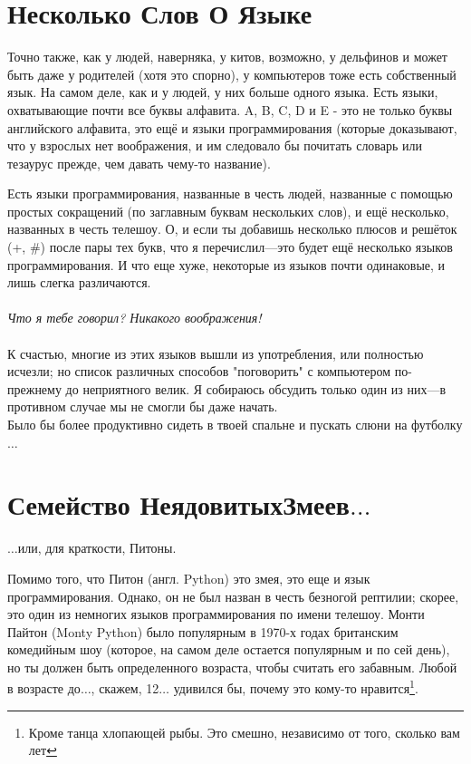 \section{Несколько Слов О Языке}

Точно также, как у людей, наверняка, у китов, возможно, у дельфинов и может быть даже у родителей (хотя это спорно), у компьютеров тоже есть собственный язык. На самом деле, как и у людей, у них больше одного языка. Есть языки, охватывающие почти все буквы алфавита. A, B, C, D и E - это не только буквы английского алфавита, это ещё и языки программирования (которые доказывают, что у взрослых нет воображения, и им следовало бы почитать словарь или тезаурус прежде, чем давать чему-то название).

Есть языки программирования, названные в честь людей, названные с помощью простых сокращений (по заглавным буквам нескольких слов), и ещё несколько, названных в честь телешоу. О, и если ты добавишь несколько плюсов и решёток (+, \#) после пары тех букв, что я перечислил---это будет ещё несколько языков программирования. И что еще хуже, некоторые из языков почти одинаковые, и лишь слегка различаются.
\\
\\
\emph{Что я тебе говорил? Никакого воображения! }
\\
\\
К счастью, многие из этих языков вышли из употребления, или полностью исчезли; но список различных способов "поговорить" с компьютером по-прежнему до неприятного велик. Я собираюсь обсудить только один из них---в противном случае мы не смогли бы даже начать.
\\
Было бы более продуктивно сидеть в твоей спальне и пускать слюни на футболку$\ldots$

\section{Семейство Неядовитых Змеев$\ldots$}

$\ldots$или, для краткости, Питоны.

Помимо того, что Питон (англ. Python) это змея, это еще и язык программирования. Однако, он не был назван в честь безногой рептилии; скорее, это один из немногих языков программирования по имени телешоу. Монти Пайтон (Monty Python) было популярным в 1970-х годах британским комедийным шоу (которое, на самом деле остается популярным и по сей день), но ты должен быть определенного возраста, чтобы считать его забавным. Любой в возрасте до$\ldots$, скажем, 12$\ldots$ удивился бы, почему это кому-то нравится\footnote{Кроме танца хлопающей рыбы. Это смешно, независимо от того, сколько вам лет}.

